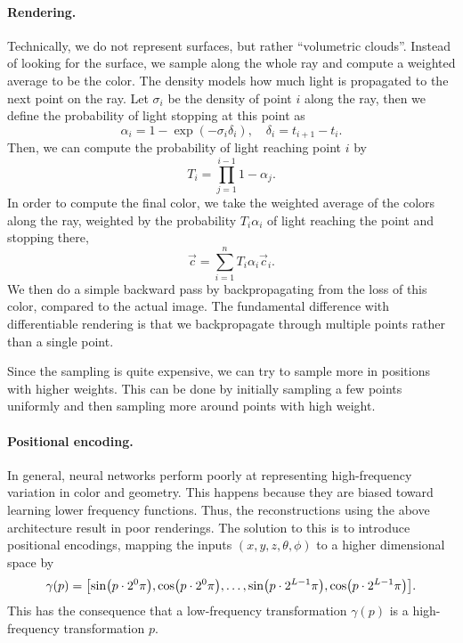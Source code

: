 \paragraph{Rendering.}

Technically, we do not represent surfaces, but rather ``volumetric clouds''. Instead of looking for
the surface, we sample along the whole ray and compute a weighted average to be the color. The
density models how much light is propagated to the next point on the ray. Let $\sigma_i$ be the
density of point $i$ along the ray, then we define the probability of light stopping at this point
as \[
    \alpha_i = 1 - \exp(-\sigma_i \delta_i), \quad \delta_i = t_{i+1} - t_i.
\]
Then, we can compute the probability of light reaching point $i$ by \[
    T_i = \prod_{j=1}^{i-1} 1 - \alpha_j.
\]
In order to compute the final color, we take the weighted average of the colors along the ray,
weighted by the probability $T_i \alpha_i$ of light reaching the point and stopping there, \[
    \vec{c} = \sum_{i=1}^{n} T_i \alpha_i \vec{c}_i.
\]
We then do a simple backward pass by backpropagating from the loss of this color, compared to the
actual image. The fundamental difference with differentiable rendering is that we backpropagate
through multiple points rather than a single point.

Since the sampling is quite expensive, we can try to sample more in positions with higher weights.
This can be done by initially sampling a few points uniformly and then sampling more around points
with high weight.

\paragraph{Positional encoding.}

In general, neural networks perform poorly at representing high-frequency variation in color and
geometry. This happens because they are biased toward learning lower frequency functions. Thus, the
reconstructions using the above architecture result in poor renderings. The solution to this is to
introduce positional encodings, mapping the inputs $(x,y,z,\theta,\phi)$ to a higher dimensional space
by \[
    \gamma(p) = \lft[\sin\lft(p \cdot 2^0 \pi\rgt), \cos\lft(p \cdot 2^0 \pi\rgt), \ldots, \sin\lft(p \cdot 2^{L-1} \pi\rgt), \cos\lft(p \cdot 2^{L-1} \pi\rgt)\rgt].
\]
This has the consequence that a low-frequency transformation \wrt $\gamma(p)$ is a high-frequency
transformation \wrt $p$.

